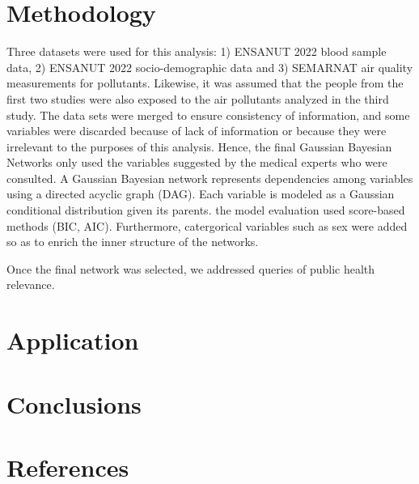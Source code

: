 \documentclass[twocolumn]{article}
\begin{document}
\section{Methodology}
Three datasets were used for this analysis: 1) ENSANUT 2022 blood sample data, 2) ENSANUT 2022 socio-demographic data and 3) SEMARNAT air quality measurements for pollutants. Likewise, it was assumed that the people from the first two studies were also exposed to the air pollutants analyzed in the third study. The data sets were merged to ensure consistency of information, and some variables were discarded because of lack of information or because they were irrelevant to the purposes of this analysis. Hence, the final Gaussian Bayesian Networks only used the variables suggested by the medical experts who were consulted.
A Gaussian Bayesian network represents dependencies among variables using a directed acyclic graph (DAG). Each variable is modeled as a Gaussian conditional distribution given its parents. the model evaluation used score-based methods (BIC, AIC). Furthermore, catergorical variables such as sex were added so as to enrich the inner structure of the networks. 

Once the final network was selected, we addressed queries of public health relevance.

\section{Application}


\section{Conclusions}


\section{References}
\begin{thebibliography}{9}
\setlength{\itemsep}{0pt}
\setlength{\parskip}{0pt}




\end{thebibliography}
\end{document}
